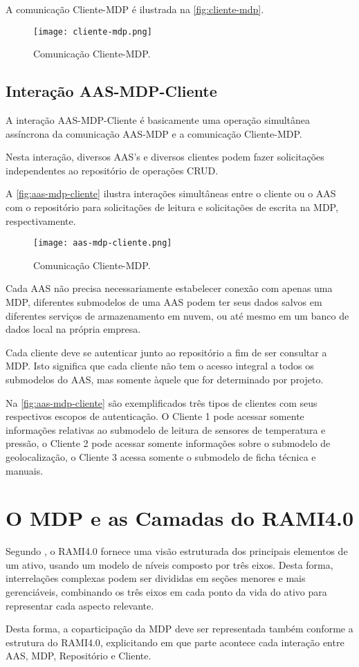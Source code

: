 	A comunicação Cliente-MDP é ilustrada na \autoref{fig:cliente-mdp}.
	
	\begin{figure}[htb]
		\centering
		\caption{Comunicação Cliente-MDP.}
		\label{fig:cliente-mdp}
		\texttt{[image: cliente-mdp.png]}
	\end{figure}
	
	
\subsection{Interação AAS-MDP-Cliente}
	
	A interação AAS-MDP-Cliente é basicamente uma operação simultânea assíncrona da comunicação AAS-MDP e a comunicação Cliente-MDP.
	
	Nesta interação, diversos AAS's e diversos clientes podem fazer solicitações independentes ao repositório de operações CRUD.
	
	A \autoref{fig:aas-mdp-cliente} ilustra interações simultâneas entre o cliente ou o AAS com o repositório para solicitações de leitura e solicitações de escrita na MDP, respectivamente.
	
	\begin{figure}[htb]
		\centering
		\caption{Comunicação Cliente-MDP.}
		\label{fig:aas-mdp-cliente}
		\texttt{[image: aas-mdp-cliente.png]}
	\end{figure}

	Cada AAS não precisa necessariamente estabelecer conexão com apenas uma MDP, diferentes submodelos de uma AAS podem ter seus dados salvos em diferentes serviços de armazenamento em nuvem, ou até mesmo em um banco de dados local na própria empresa.
	
	Cada cliente deve se autenticar junto ao repositório a fim de ser consultar a MDP. Isto significa que cada cliente não tem o acesso integral a todos os submodelos do AAS, mas somente àquele que for determinado por projeto.
	
	Na \autoref{fig:aas-mdp-cliente} são exemplificados três tipos de clientes com seus respectivos escopos de autenticação. O Cliente 1 pode acessar somente informações relativas ao submodelo de leitura de sensores de temperatura e pressão, o Cliente 2 pode acessar somente informações sobre o submodelo de geolocalização, o Cliente 3 acessa somente o submodelo de ficha técnica e manuais.
	
	\section{O MDP e as Camadas do RAMI4.0}

	Segundo , o RAMI4.0 fornece uma visão estruturada dos principais elementos de um ativo, usando um modelo de níveis composto por três eixos. Desta forma, interrelações complexas podem ser divididas em seções menores e mais gerenciáveis, combinando os três eixos em cada ponto da vida do ativo para representar cada aspecto relevante.
	
	Desta forma, a coparticipação da MDP deve ser representada também conforme a estrutura do RAMI4.0, explicitando em que parte acontece cada interação entre AAS, MDP, Repositório e Cliente.
